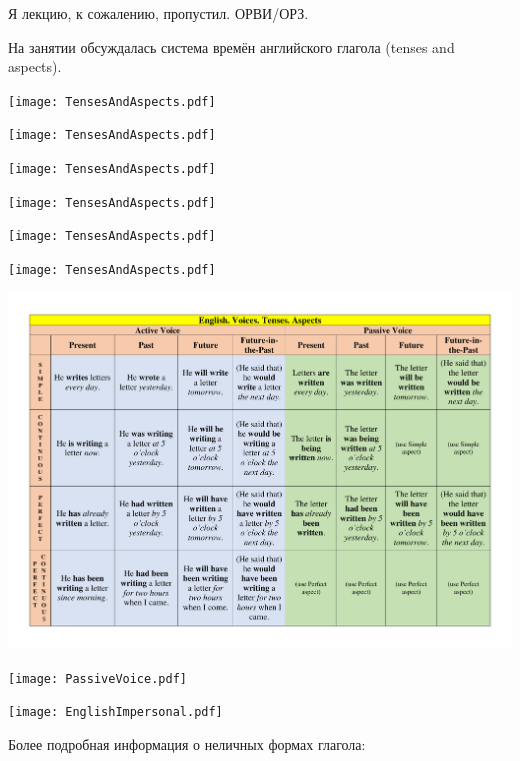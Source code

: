 \documentclass[main.tex]{subfiles}
\begin{document}

Я лекцию, к сожалению, пропустил. ОРВИ/ОРЗ.

На занятии обсуждалась система времён английского глагола (tenses and aspects).

\label{subsec:tenses-usage}
\vspace{-10mm}
{\parindent-20pt\texttt{[image: TensesAndAspects.pdf]}}\newpage

\vspace{-5mm}
{\parindent-20pt\texttt{[image: TensesAndAspects.pdf]}}\newpage

\vspace{-5mm}
{\parindent-20pt\texttt{[image: TensesAndAspects.pdf]}}\newpage

\vspace{-5mm}
{\parindent-20pt\texttt{[image: TensesAndAspects.pdf]}}\newpage

\vspace{-5mm}
{\parindent-20pt\texttt{[image: TensesAndAspects.pdf]}}\newpage

{\parindent-20pt\texttt{[image: TensesAndAspects.pdf]}}


{\parindent0pt\includegraphics[width=\textwidth,page=1,trim={0.5in 0in 0.49in 0in},clip=true]{EnglishTensesAspectsVoicesPoster.pdf}}


{\parindent-10pt\texttt{[image: PassiveVoice.pdf]}}\newpage

\label{subsec:impersonal-lk}

{\parindent0pt\texttt{[image: EnglishImpersonal.pdf]}}

Более подробная информация о неличных формах глагола: \hyperref[subsec:impersonal-forms-full-view]{\color{blue}{НЕЛИЧНЫЕ ФОРМЫ ГЛАГОЛА}}
\end{document}
